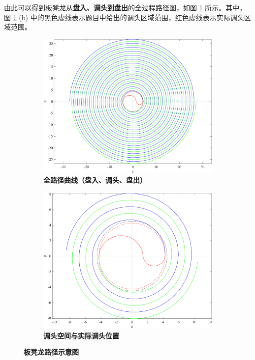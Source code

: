 \documentclass[zihao=-4, UTF8]{article}		%
\theoremstyle{MyLineTheoremStyle} %
\theoremstyle{MyBlockTheoremStyle} %
\theoremstyle{MySubsubsectionStyle} %
\begin{document}
由此可以得到板凳龙从\textbf{盘入、调头到盘出}的全过程路径图，如图 \ref*{板凳龙路径示意图} 所示。其中，图 \ref*{板凳龙路径示意图} (b) 中的黑色虚线表示题目中给出的调头区域范围，红色虚线表示实际调头区域范围。
\begin{figure}[H]\centering
\begin{subfigure}[t]{0.48\textwidth}\centering
    \includegraphics[width=\textwidth]{assets/Q4全路径.pdf}
    \caption{\bfseries 全路径曲线（盘入、调头、盘出） }
\end{subfigure}\begin{subfigure}[t]{0.48\textwidth}\centering
    \includegraphics[width=\textwidth]{assets/Q4实际调头位置.pdf}
    \caption{\bfseries 调头空间与实际调头位置 }
\end{subfigure}
\caption{\bfseries 板凳龙路径示意图 }\label{板凳龙路径示意图}
\end{figure}
\end{document}
